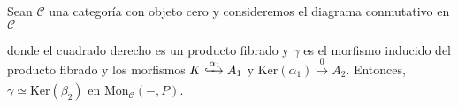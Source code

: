 \documentclass[tesis]{subfiles}
\begin{document}
\begin{Prop}\label{Mendoza-1.5.6}
    Sean $\mathscr{C}$ una categoría con objeto cero y consideremos el diagrama conmutativo en $\mathscr{C}$
    \begin{center}
    \end{center}
    donde el cuadrado derecho es un producto fibrado y $\gamma$ es el morfismo inducido del producto fibrado y los morfismos $K\xhookrightarrow[]{\alpha_1} A_1$ y $\text{Ker}(\alpha_1)\xrightarrow[]{0}A_2$. Entonces, $\gamma\simeq\text{Ker}(\beta_2)$ en $\text{Mon}_\mathscr{C}(-,P)$.
\end{Prop}
\end{document}
